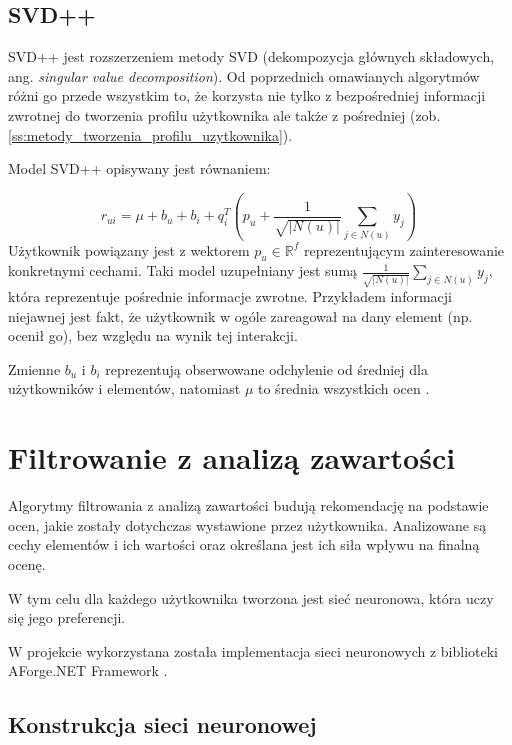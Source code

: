 \documentclass[twoside]{iisthesis}
\begin{document}
		 \subsection{SVD++}
		 
		 SVD++ jest rozszerzeniem metody SVD (dekompozycja głównych składowych, ang. \textit{singular value decomposition}). Od poprzednich omawianych algorytmów różni go przede wszystkim to, że korzysta nie tylko z bezpośredniej informacji zwrotnej do tworzenia profilu użytkownika ale także z pośredniej (zob. \ref{ss:metody_tworzenia_profilu_uzytkownika}).
		 
		 Model SVD++ opisywany jest równaniem:
		 
		 \begin{equation}
		 	\label{eq:svd}
		 	r_{ui} = \mu + b_u + b_i + q_i^T (p_u + \frac{1}{\sqrt{|N(u)|}} \sum_{j \in N(u)}^{} y_j) 
		 	\,
		 \end{equation}		 		 
		 Użytkownik powiązany jest z wektorem $p_u \in \mathbb{R} ^f$ reprezentującym zainteresowanie konkretnymi cechami. Taki model uzupełniany jest sumą  $\frac{1}{\sqrt{|N(u)|}} \sum_{j \in N(u)}^{} y_j$, która reprezentuje pośrednie informacje zwrotne. Przykładem informacji niejawnej jest fakt, że użytkownik w ogóle zareagował na dany element (np. ocenił go), bez względu na wynik tej interakcji. 
		  
		 Zmienne $b_u$ i $b_i$ reprezentują obserwowane odchylenie od średniej dla użytkowników i elementów, natomiast $\mu$ to średnia wszystkich ocen \cite{koren2008factorization}. 
		 	 
		 
	 \section{Filtrowanie z analizą zawartości}
	 
	 
		 Algorytmy filtrowania z analizą zawartości budują rekomendację na podstawie ocen, jakie zostały dotychczas wystawione przez użytkownika. Analizowane są cechy elementów i ich wartości oraz określana jest ich siła wpływu na finalną ocenę. 
		 
		 W tym celu dla każdego użytkownika tworzona jest sieć neuronowa, która uczy się jego preferencji. 
		 
		 W projekcie wykorzystana została implementacja sieci neuronowych z biblioteki AForge.NET Framework \cite{aforgenet}.
	 
		 \subsection{Konstrukcja sieci neuronowej}
		 
\end{document}
